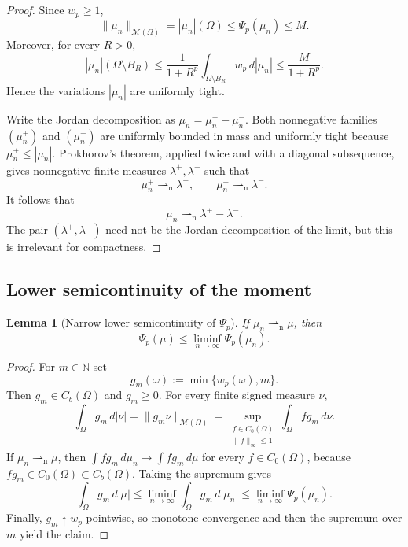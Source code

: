 \documentclass[11pt]{amsart}
\newtheorem{lemma}[theorem]{Lemma}
\theoremstyle{definition}
\theoremstyle{remark}
\newcommand{\M}{\mathcal{M}}
\newcommand{\weakn}{\rightharpoonup_{\mathrm n}}
\begin{document}
\begin{proof}
Since $w_p\geq1$,
\[
  \|\mu_n\|_{\M(\Omega)}
  =|\mu_n|(\Omega)
  \leq\Psi_p(\mu_n)
  \leq M.
\]
Moreover, for every $R>0$,
\begin{equation}
  \label{eq:tightness-estimate}
  |\mu_n|(\Omega\setminus B_R)
  \leq
  \frac{1}{1+R^p}
  \int_{\Omega\setminus B_R}w_p\,d|\mu_n|
  \leq\frac{M}{1+R^p}.
\end{equation}
Hence the variations $|\mu_n|$ are uniformly tight.

Write the Jordan decomposition as
$\mu_n=\mu_n^+-\mu_n^-$.  Both nonnegative families
$(\mu_n^+)$ and $(\mu_n^-)$ are uniformly bounded in mass and uniformly
tight because $\mu_n^\pm\leq|\mu_n|$.  Prokhorov's theorem, applied twice and
with a diagonal subsequence, gives nonnegative finite measures
$\lambda^+,\lambda^-$ such that
\[
  \mu_n^+\weakn\lambda^+,
  \qquad
  \mu_n^-\weakn\lambda^-.
\]
It follows that
\[
  \mu_n\weakn\lambda^+-\lambda^-.
\]
The pair $(\lambda^+,\lambda^-)$ need not be the Jordan decomposition of the
limit, but this is irrelevant for compactness.
\end{proof}

\subsection{Lower semicontinuity of the moment}

\begin{lemma}[Narrow lower semicontinuity of $\Psi_p$]
\label{lem:moment-lsc}
If $\mu_n\weakn\mu$, then
\[
  \Psi_p(\mu)
  \leq
  \liminf_{n\to\infty}\Psi_p(\mu_n).
\]
\end{lemma}

\begin{proof}
For $m\in\mathbb{N}$ set
\[
  g_m(\omega):=\min\{w_p(\omega),m\}.
\]
Then $g_m\in C_b(\Omega)$ and $g_m\geq0$.  For every finite signed measure
$\nu$,
\[
  \int_\Omega g_m\,d|\nu|
  =
  \|g_m\nu\|_{\M(\Omega)}
  =
  \sup_{\substack{f\in C_0(\Omega)\\\|f\|_\infty\leq1}}
  \int_\Omega f g_m\,d\nu.
\]
If $\mu_n\weakn\mu$, then
$\int f g_m\,d\mu_n\to\int f g_m\,d\mu$ for every
$f\in C_0(\Omega)$, because $fg_m\in C_0(\Omega)\subset C_b(\Omega)$.
Taking the supremum gives
\[
  \int_\Omega g_m\,d|\mu|
  \leq
  \liminf_{n\to\infty}\int_\Omega g_m\,d|\mu_n|
  \leq
  \liminf_{n\to\infty}\Psi_p(\mu_n).
\]
Finally, $g_m\uparrow w_p$ pointwise, so monotone convergence and then the
supremum over $m$ yield the claim.
\end{proof}
\end{document}
